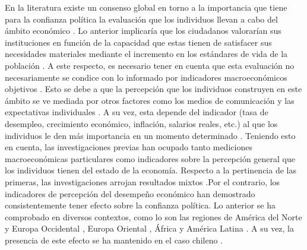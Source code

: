 \documentclass[12pt,twoside]{templates/facsothesis}
\begin{document}
En la literatura existe un consenso global en torno a la importancia que tiene para la confianza política la evaluación que los individuos llevan a cabo del ámbito económico \citep{eastonReassessmentConceptPolitical1975, leeEconomicPerformanceIncome2020, mishlerWhatAreOrigins2001, norrisDemocraticDeficitCritical2011, oskarssonGeneralizedTrustPolitical2010, vandermeerEconomicPerformancePolitical2018, wangGovernmentPerformanceCorruption2016}. Lo anterior implicaría que los ciudadanos valorarían sus instituciones en función de la capacidad que estas tienen de satisfacer sus necesidades materiales mediante el incremento en los estándares de vida de la población \citep{quarantaDoesEconomyReally2016, thomassenSupportDemocraticValues1998, mcallisterEconomicPerformanceGovernments1999}. A este respecto, es necesario tener en cuenta que esta evaluación no necesariamente se condice con lo informado por indicadores macroeconómicos objetivos \citep{vandermeerEconomicPerformancePolitical2018}. Esto se debe a que la percepción que los individuos construyen en este ámbito se ve mediada por otros factores como los medios de comunicación y las expectativas individuales \citep{mcallisterEconomicPerformanceGovernments1999}. A su vez, esta depende del indicador (tasa de desempleo, crecimiento económico, inflación, salarios reales, etc.) al que los individuos le den más importancia en un momento determinado \citep{daltonDemocraticChallengesDemocratic2004}. Teniendo esto en cuenta, las investigaciones previas han ocupado tanto mediciones macroeconómicas particulares como indicadores sobre la percepción general que los individuos tienen del estado de la economía. Respecto a la pertinencia de las primeras, las investigaciones arrojan resultados mixtos \citep{andersonCorruptionPoliticalAllegiances2003, leeEconomicPerformanceIncome2020, mishlerWhatAreOrigins2001, vandermeerPoliticalTrustEvaluation2017}.Por el contrario, los indicadores de percepción del desempeño económico han demostrado consistentemente tener efecto sobre la confianza política. Lo anterior se ha comprobado en diversos contextos, como lo son las regiones de América del Norte y Europa Occidental \citep{oskarssonGeneralizedTrustPolitical2010, torcalDeclinePoliticalTrust2014a}, Europa Oriental \citep{mishlerWhatAreOrigins2001}, África \citep{stoyanTrustGovernmentInstitutions2016} y América Latina \citep{bargstedPoliticalTrustLatin2017, mainwaringStateDeficienciesParty2006, mattesSocialPoliticalTrust2018, stoyanTrustGovernmentInstitutions2016, torcalConfianzaPoliticaEuropa2015}. A su vez, la presencia de este efecto se ha mantenido en el caso chileno \citep{riffoQueInfluyeConfianza2019, saldanazunigaConfianzaInstitucionesPoliticas2019, segoviaMalaiseDemocracyChile2016}.
\end{document}
